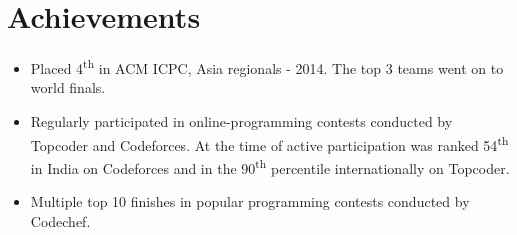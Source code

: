 \documentclass[letterpaper]{article}
\begin{document}
\section*{Achievements}
\begin{itemize}
\item Placed 4\textsuperscript{th} in ACM ICPC, Asia regionals - 2014. The top 3 teams went on to world finals.
\vspace{-2mm}
\item Regularly participated in online-programming contests conducted by Topcoder and Codeforces. At the time of
active participation was ranked 54\textsuperscript{th} in India on Codeforces and in the 90\textsuperscript{th}
percentile internationally on Topcoder.
\vspace{-2mm}
\item Multiple top 10 finishes in popular programming contests conducted by Codechef.
\end{itemize}
\end{document}
